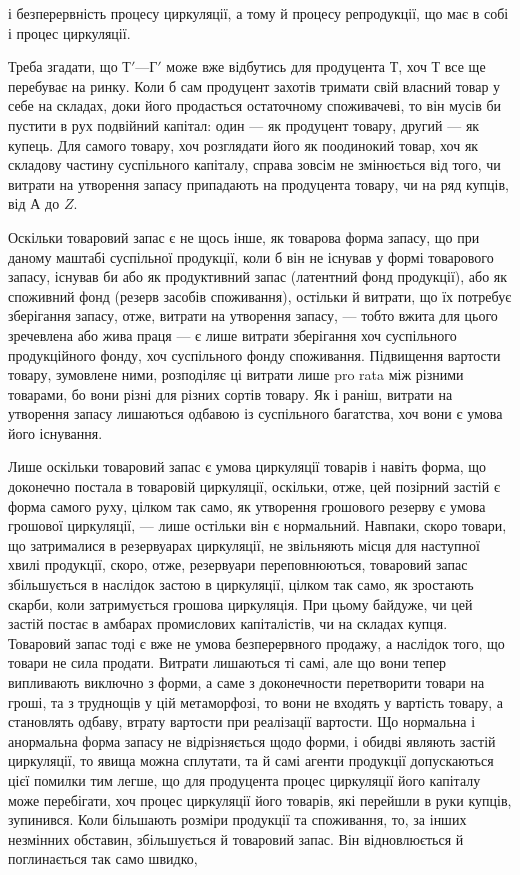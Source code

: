 \parcont{}  %
і безперервність процесу циркуляції, а тому й процесу репродукції, що
має в собі і процес циркуляції.

Треба згадати, що $Т' — Г'$ може вже відбутись для продуцента $Т$,
хоч $Т$ все ще перебуває на ринку. Коли б сам продуцент захотів тримати
свій власний товар у себе на складах, доки його продасться остаточному
споживачеві, то він мусів би пустити в рух подвійний капітал:
один — як продуцент товару, другий — як купець. Для самого товару,
хоч розглядати його як поодинокий товар, хоч як складову частину
суспільного капіталу, справа зовсім не змінюється від того, чи витрати
на утворення запасу припадають на продуцента товару, чи на ряд купців,
від $А$ до $Z$.

Оскільки товаровий запас є не щось інше, як товарова форма запасу,
що при даному маштабі суспільної продукції, коли б він не існував у
формі товарового запасу, існував би або як продуктивний запас (латентний
фонд продукції), або як споживний фонд (резерв засобів споживання),
остільки й витрати, що їх потребує зберігання запасу, отже, витрати на
утворення запасу, — тобто вжита для цього зречевлена або жива праця —
є лише витрати зберігання хоч суспільного продукційного фонду,
хоч суспільного фонду споживання. Підвищення вартости товару,
зумовлене ними, розподіляє ці витрати лише pro rata між різними
товарами, бо вони різні для різних сортів товару. Як і раніш,
витрати на утворення запасу лишаються одбавою із суспільного багатства,
хоч вони є умова його існування.

Лише оскільки товаровий запас є умова циркуляції товарів і навіть
форма, що доконечно постала в товаровій циркуляції, оскільки, отже,
цей позірний застій є форма самого руху, цілком так само, як утворення
грошового резерву є умова грошової циркуляції, — лише остільки
він є нормальний. Навпаки, скоро товари, що затрималися в резервуарах
циркуляції, не звільняють місця для наступної хвилі продукції,
скоро, отже, резервуари переповнюються, товаровий запас збільшується
в наслідок застою в циркуляції, цілком так само, як зростають
скарби, коли затримується грошова циркуляція. При цьому
байдуже, чи цей застій постає в амбарах промислових капіталістів, чи
на складах купця. Товаровий запас тоді є вже не умова безперервного
продажу, а наслідок того, що товари не сила продати. Витрати лишаються
ті самі, але що вони тепер випливають виключно з форми, а саме з
доконечности перетворити товари на гроші, та з труднощів у цій метаморфозі,
то вони не входять у вартість товару, а становлять одбаву, втрату
вартости при реалізації вартости. Що нормальна і анормальна форма
запасу не відрізняється щодо форми, і обидві являють застій циркуляції,
то явища можна сплутати, та й самі агенти продукції допускаються
цієї помилки тим легше, що для продуцента процес циркуляції
його капіталу може перебігати, хоч процес циркуляції його товарів,
які перейшли в руки купців, зупинився. Коли більшають розміри
продукції та споживання, то, за інших незмінних обставин, збільшується
й товаровий запас. Він відновлюється й поглинається так само швидко,
\parbreak{}  %
